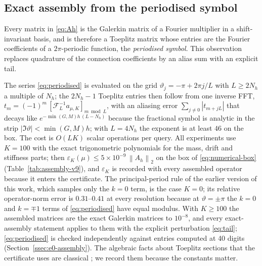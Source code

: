 \documentclass[hidelinks]{siamart251216}
\newcommand{\Ah}{A_h}
\newcommand{\norm}[1]{\left\lVert #1\right\rVert}
\newcommand{\sym}[1]{#1}                 %
\begin{document}
\subsection{Exact assembly from the periodised symbol}
\label{ssec:assembly}
Every matrix in \eqref{eq:Ah} is the Galerkin matrix of a Fourier multiplier in a shift-invariant
basis, and is therefore a Toeplitz matrix whose entries are the Fourier coefficients of a
$2\pi$-periodic function, the \emph{periodised symbol}.  This observation replaces quadrature of
the connection coefficients by an alias sum with an explicit tail.


The series \eqref{eq:periodised} is evaluated on the grid $\vartheta_j=-\pi+2\pi j/L$ with
$L\ge 2N_h$ a multiple of $N_h$; the $2N_h-1$ Toeplitz entries then follow from one inverse FFT,
$t_m=(-1)^m\,[\mathcal F_L^{-1}\sym{a}_{\mu,K}]_{m\bmod L}$, with an aliasing error
$\sum_{j\ne0}|t_{m+jL}|$ that decays like $e^{-\min(G,M)h\,(L-N_h)}$ because the fractional symbol is
analytic in the strip $|\Im\vartheta|<\min(G,M)h$; with $L=4N_h$ the exponent is at least $46$ on the
box.  The cost is $O(LK)$ scalar operations per query.
All experiments use $K=100$ with the exact trigonometric polynomials for the mass, drift and
stiffness parts; then $\varepsilon_K(\mu)\le5\times10^{-9}\,\norm{\Ah}_2$ on the box of
\eqref{eq:numerical-box} (Table~\ref{tab:assembly-v9}), and $\varepsilon_K$ is recorded with
every assembled operator because it enters the certificate.  The principal-period rule of the
earlier version of this work, which samples only the $k=0$ term, is the case $K=0$; its relative
operator-norm error is $0.31$--$0.41$ at every resolution because at $\vartheta=\pm\pi$ the $k=0$
and $k=\mp1$ terms of \eqref{eq:periodised} have equal modulus.  With $K\ge100$ the assembled
matrices are the exact Galerkin matrices to $10^{-8}$, and every exact-assembly statement applies
to them with the explicit perturbation \eqref{eq:tail}; \eqref{eq:periodised} is checked
independently against entries computed at 40 digits (Section~\ref{ssec:e0-assembly}).
The algebraic facts about Toeplitz sections that the certificate uses are classical
\cite{GrenanderSzego1958,BottcherSilbermann1999}; we record them because the constants matter.

\end{document}
